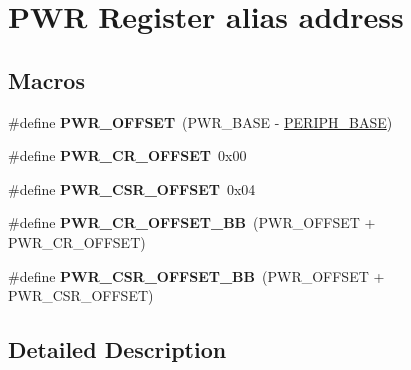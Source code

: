 \hypertarget{group___p_w_r__register__alias__address}{\section{P\-W\-R Register alias address}
\label{group___p_w_r__register__alias__address}
}
\subsection*{Macros}
\begin{DoxyCompactItemize}
\item 
\hypertarget{group___p_w_r__register__alias__address_ga7f88bce73931300319824f22578f90de}{\#define {\bfseries P\-W\-R\-\_\-\-O\-F\-F\-S\-E\-T}~(P\-W\-R\-\_\-\-B\-A\-S\-E -\/ \hyperlink{group___peripheral__memory__map_ga9171f49478fa86d932f89e78e73b88b0}{P\-E\-R\-I\-P\-H\-\_\-\-B\-A\-S\-E})}\label{group___p_w_r__register__alias__address_ga7f88bce73931300319824f22578f90de}

\item 
\hypertarget{group___p_w_r__register__alias__address_gafc4a9746ee5df183f01c6c9b2b193bf8}{\#define {\bfseries P\-W\-R\-\_\-\-C\-R\-\_\-\-O\-F\-F\-S\-E\-T}~0x00}\label{group___p_w_r__register__alias__address_gafc4a9746ee5df183f01c6c9b2b193bf8}

\item 
\hypertarget{group___p_w_r__register__alias__address_ga5108a7917314663531d70bdf05ea2698}{\#define {\bfseries P\-W\-R\-\_\-\-C\-S\-R\-\_\-\-O\-F\-F\-S\-E\-T}~0x04}\label{group___p_w_r__register__alias__address_ga5108a7917314663531d70bdf05ea2698}

\item 
\hypertarget{group___p_w_r__register__alias__address_ga387e4e883d6bea5c2223adc42ee72daa}{\#define {\bfseries P\-W\-R\-\_\-\-C\-R\-\_\-\-O\-F\-F\-S\-E\-T\-\_\-\-B\-B}~(P\-W\-R\-\_\-\-O\-F\-F\-S\-E\-T + P\-W\-R\-\_\-\-C\-R\-\_\-\-O\-F\-F\-S\-E\-T)}\label{group___p_w_r__register__alias__address_ga387e4e883d6bea5c2223adc42ee72daa}

\item 
\hypertarget{group___p_w_r__register__alias__address_gaa9477acfcacc4610533df164c94ad6fd}{\#define {\bfseries P\-W\-R\-\_\-\-C\-S\-R\-\_\-\-O\-F\-F\-S\-E\-T\-\_\-\-B\-B}~(P\-W\-R\-\_\-\-O\-F\-F\-S\-E\-T + P\-W\-R\-\_\-\-C\-S\-R\-\_\-\-O\-F\-F\-S\-E\-T)}\label{group___p_w_r__register__alias__address_gaa9477acfcacc4610533df164c94ad6fd}

\end{DoxyCompactItemize}


\subsection{Detailed Description}
